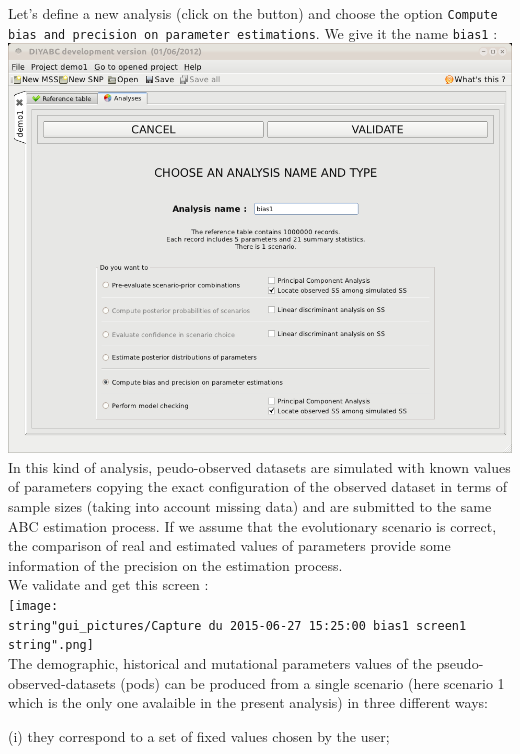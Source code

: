 Let's define a new analysis (click on the  button) and choose the option \texttt{Compute bias and
precision on parameter estimations}. We give it the name \texttt{bias1}
:\\


\includegraphics[scale=0.35]{gui_pictures/Capture-DIYABC-43} \\


In this kind of analysis, peudo-observed datasets are simulated with
known values of parameters copying the exact configuration of the
observed dataset in terms of sample sizes (taking into account missing
data) and are submitted to the same ABC estimation process. If we
assume that the evolutionary scenario is correct, the comparison of
real and estimated values of parameters provide some information of
the precision on the estimation process.\\
 We validate and get this screen :\\


\texttt{[image: \\string"gui\_pictures/Capture du 2015-06-27 15:25:00 bias1 screen1\\string".png]}
\\
The demographic, historical and mutational parameters values of the
pseudo-observed-datasets (pods) can be produced from a single scenario
(here scenario 1 which is the only one avalaible in the present analysis)
in three different ways:

(i) they correspond to a set of fixed values chosen by the user;

